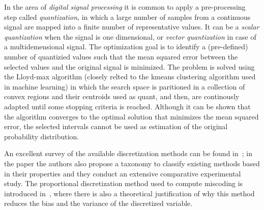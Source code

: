 In the area of \emph{digital signal processing} \cite{gersho2012vector} it is common to apply a pre-processing step called \emph{quantization}, in which a large number of samples from a continuous signal are mapped into a finite number of representative values. It can be a \emph{scalar quantization} when the signal is one dimensional, or \emph{vector quantization} in case of a multidemensional signal. The optimization goal is to identify a (pre-defined) number of quantizied values such that the mean squared error between the selected values and the original signal is minimized. The problem is solved using the Lloyd-max algorithm \cite{lloyd1982least} (closely relted to the kmeans clustering algorithm \cite{} used in machine learning) in which the search space is paritioned in a collection of convex regions and their centroids used as quant, and then, are continously adapted until some stopping criteria is reached. Although it can be shown that the algorithm converges to the optimal solution that minimizes the mean squared error, the selected intervals cannot be used as estimation of the original probability distribution.

An excellent survey of the available discretization methods can be found in~\cite{garcia2013survey}; in the paper the authors also propose a taxonomy to classify existing methods based in their properties and they conduct an extensive comparative experimental study. The proportional discretization method used to compute miscoding is introduced in~\cite{yang2009discretization}, where there is also a theoretical justification of why this method reduces the bias and the variance of the discretized variable.

